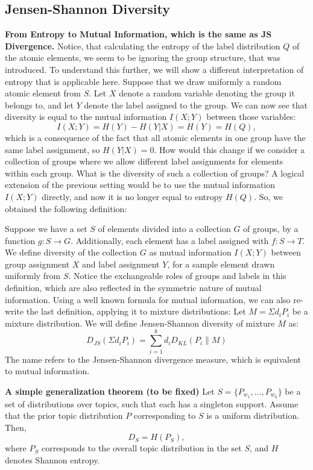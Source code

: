 \documentclass{article}
\begin{document}
\subsection{Jensen-Shannon Diversity}
\label{sec:jensen-shannon-divergence}
{\bf From Entropy to Mutual Information, which is the same as JS
  Divergence. }
Notice, that calculating the entropy of the label
distribution $Q$ of the atomic elements, we seem to be ignoring the
group structure, that was introduced. To understand this further, we
will show a different interpretation of entropy that is applicable
here. Suppose that we draw uniformly a random atomic element from
$S$. Let $X$ denote a random variable denoting the group it belongs
to, and let $Y$ denote the label assigned to the group. We can now
see that diversity is equal to the mutual information $I(X;Y)$ between
those variables: 
\[I(X;Y)=H(Y)-H(Y|X) = H(Y)=H(Q),\]
which is a consequence of the fact that all atomic elements in one
group have the same label assignment, so $H(Y|X)=0$. How would this change if we consider a collection of
groups where we allow different label assignments for elements within
each group. What is the diversity of such a collection of groups? A
logical extension of the previous setting would be to use the mutual
information $I(X;Y)$ directly, and now it is no longer equal to entropy
$H(Q)$. So, we obtained the following definition:

\bed\label{mutual}
Suppose we have a set $S$ of elements divided into a collection $G$ of
groups, by a function $g:S\rightarrow G$. Additionally, each element
has a label assigned with $f:S\rightarrow T$. We define diversity
of the collection $G$ as
mutual information $I(X;Y)$ between group assignment $X$ and label
assignment $Y$, for 
a sample element drawn uniformly from $S$.
\eed
Notice the exchangeable roles of groups and labels in this
definition, which are also reflected in the symmetric nature of mutual
information. Using a well known formula for mutual information, we 
can also re-write the last definition, applying it to mixture
distributions:
\bed\label{mixture}
Let $M=\Sigma d_i P_i$ be a mixture distribution. We will define
Jensen-Shannon diversity of mixture $M$ as:
\[D_{JS}(\Sigma d_iP_i) = \sum_{i=1}^k d_i D_{KL}(P_i\|M)\]
\eed
The name refers to the Jensen-Shannon divergence measure, which
is equivalent to mutual information.

{\bf A simple generalization theorem (to be fixed)}
\bep\label{entropy}
Let $S=\{P_{w_1},...,P_{w_k}\}$ be a set of distributions over topics,
such that each has a singleton support. Assume that the prior
topic distribution $P$ corresponding to $S$ is a uniform
distribution. Then, 
\[D_S=H(P_S),\]
where $P_S$ corresponds to the overall topic distribution in the set
$S$, and $H$ denotes Shannon entropy.
\eep
\end{document}
